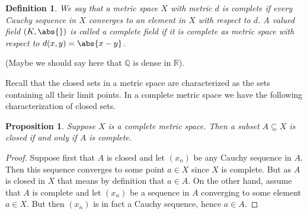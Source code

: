 \documentclass{article}
\newtheorem{definition}{Definition}[section]
\newtheorem{proposition}{Proposition}[section]
\newcommand{\mbb}[1]{\mathbb{#1}}
\begin{document}

\begin{definition}
    We say that a metric space $X$ with metric $d$ is complete if every Cauchy sequence in $X$ converges to an element in $X$ with respect to $d$. A valued field $(K, \abs{})$ is called a complete field if it is complete as metric space with respect to $d(x,y) = \abs{x - y}$.
\end{definition}

(Maybe we should say here that $\mbb Q$ is dense in $\mbb R$).

Recall that the closed sets in a metric space are characterized as the sets containing all their limit points. In a complete metric space we have the following characterization of closed sets. 


\begin{proposition}
    Suppose $X$ is a complete metric space. Then a subset $A \subseteq X$ is closed if and only if $A$ is complete.
\end{proposition}
\begin{proof}
    Suppose first that $A$ is closed and let $(x_n)$ be any Cauchy sequence in $A$. Then this sequence converges to some point $a \in X$ since $X$ is complete. But as $A$ is closed in $X$ that means by definition that $a \in A$. On the other hand, assume that $A$ is complete and let $(x_n)$ be a sequence in $A$ converging to some element $a \in X$. But then $(x_n)$ is in fact a Cauchy sequence, hence $a \in A$.  
\end{proof}
\end{document}
